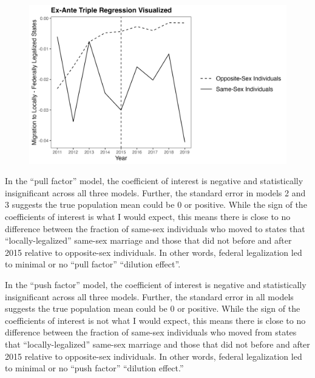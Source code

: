 \documentclass[12pt,letterpaper]{article}
\begin{document}
\begin{figure}[h]
    \centering
    \includegraphics[width=0.75\linewidth]{outputs/summary_stats/ante_diffs.png}
    \caption{}
    \label{fig: ante_diffs}
\end{figure}

In the “pull factor” model, the coefficient of interest is negative and statistically insignificant across all three models. Further, the standard error in models 2 and 3 suggests the true population mean could be 0 or positive. While the sign of the coefficients of interest is what I would expect, this means there is close to no difference between the fraction of same-sex individuals who moved to states that “locally-legalized” same-sex marriage and those that did not before and after 2015 relative to opposite-sex individuals. In other words, federal legalization led to minimal or no “pull factor” “dilution effect”. 

In the “push factor” model, the coefficient of interest is negative and statistically insignificant across all three models. Further, the standard error in all models suggests the true population mean could be 0 or positive. While the sign of the coefficients of interest is not what I would expect, this means there is close to no difference between the fraction of same-sex individuals who moved from states that “locally-legalized” same-sex marriage and those that did not before and after 2015 relative to opposite-sex individuals. In other words, federal legalization led to minimal or no “push factor” “dilution effect.”  
\end{document}

